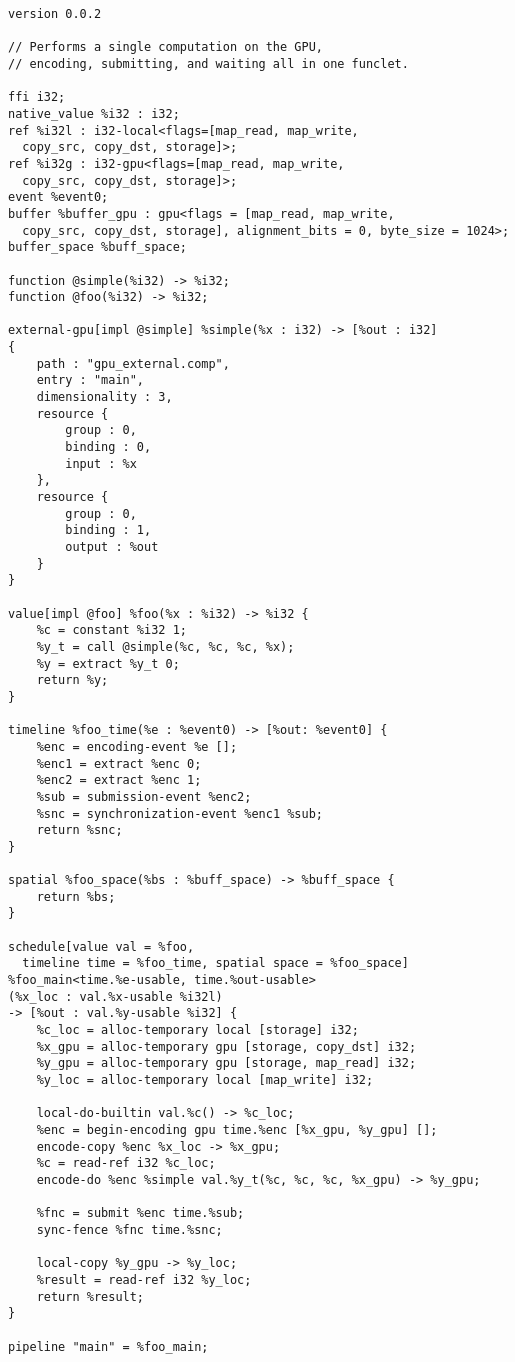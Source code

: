 \begin{lstlisting}
version 0.0.2

// Performs a single computation on the GPU,
// encoding, submitting, and waiting all in one funclet.

ffi i32;
native_value %i32 : i32;
ref %i32l : i32-local<flags=[map_read, map_write, 
  copy_src, copy_dst, storage]>;
ref %i32g : i32-gpu<flags=[map_read, map_write, 
  copy_src, copy_dst, storage]>;
event %event0;
buffer %buffer_gpu : gpu<flags = [map_read, map_write, 
  copy_src, copy_dst, storage], alignment_bits = 0, byte_size = 1024>;
buffer_space %buff_space;

function @simple(%i32) -> %i32;
function @foo(%i32) -> %i32;

external-gpu[impl @simple] %simple(%x : i32) -> [%out : i32]
{
    path : "gpu_external.comp",
    entry : "main",
    dimensionality : 3,
    resource {
        group : 0,
        binding : 0,
        input : %x
    },
    resource {
        group : 0,
        binding : 1,
        output : %out
    }
}

value[impl @foo] %foo(%x : %i32) -> %i32 {
    %c = constant %i32 1;
    %y_t = call @simple(%c, %c, %c, %x);
    %y = extract %y_t 0;
    return %y;
}

timeline %foo_time(%e : %event0) -> [%out: %event0] {
    %enc = encoding-event %e [];
    %enc1 = extract %enc 0;
    %enc2 = extract %enc 1;
    %sub = submission-event %enc2;
    %snc = synchronization-event %enc1 %sub;
    return %snc;
}

spatial %foo_space(%bs : %buff_space) -> %buff_space {
    return %bs;
}

schedule[value val = %foo, 
  timeline time = %foo_time, spatial space = %foo_space]
%foo_main<time.%e-usable, time.%out-usable>
(%x_loc : val.%x-usable %i32l)
-> [%out : val.%y-usable %i32] {
    %c_loc = alloc-temporary local [storage] i32;
    %x_gpu = alloc-temporary gpu [storage, copy_dst] i32;
    %y_gpu = alloc-temporary gpu [storage, map_read] i32;
    %y_loc = alloc-temporary local [map_write] i32;

    local-do-builtin val.%c() -> %c_loc;
    %enc = begin-encoding gpu time.%enc [%x_gpu, %y_gpu] [];
    encode-copy %enc %x_loc -> %x_gpu;
    %c = read-ref i32 %c_loc;
    encode-do %enc %simple val.%y_t(%c, %c, %c, %x_gpu) -> %y_gpu;

    %fnc = submit %enc time.%sub;
    sync-fence %fnc time.%snc;
    
    local-copy %y_gpu -> %y_loc;
    %result = read-ref i32 %y_loc;
    return %result;
}

pipeline "main" = %foo_main;
\end{lstlisting}

